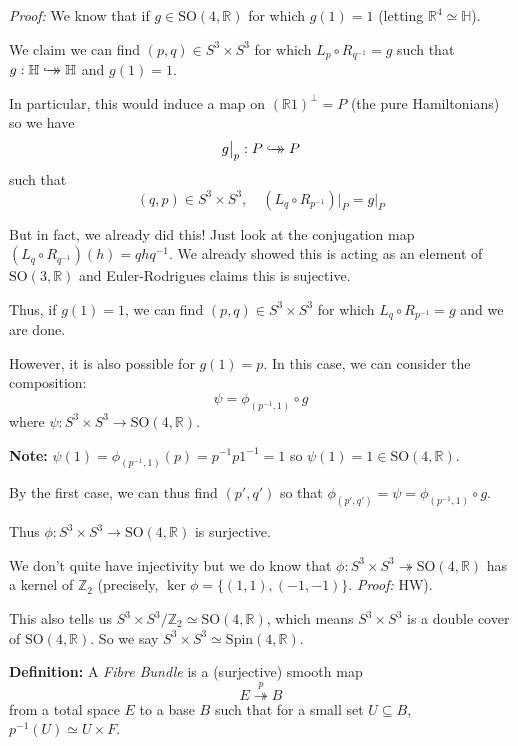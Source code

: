 \documentclass[12pt]{article}
\newcommand{\R}{\mathbb{R}}
\newcommand{\Z}{\mathbb{Z}}
\renewcommand{\H}{\mathbb{H}}
\newcommand{\SO}{\text{SO}}
\newcommand{\biject}{\hookrightarrow \hspace{-8pt} \rightarrow}
\newenvironment*{tbox}[2][gray]{
    \begin{tcolorbox}[
        parbox=false,
        colback=#1!5!white,
        colframe=#1!75!black,
        breakable,
        title={#2}
    ]}
    {\end{tcolorbox}}
\begin{document}
    \begin{tbox}{\textbf{Claim:} This homomorphism is onto $\SO(4, \R)$}
        \emph{Proof:} We know that if $g \in \SO(4, \R)$ for which $g(1) = 1$ (letting $\R^4 \simeq \H$).

        We claim we can find $(p, q) \in S^3 \times S^3$ for which $L_p \circ R_{q^{-1}} = g$ such that $g: \H \biject \H$ and $g(1) = 1$. 

        In particular, this would induce a map on $(\R 1)^{\perp} = P$ (the pure Hamiltonians) so we have 
        \[g\big\vert_p: P \biject P\]
        such that 
        \[(q, p)\in S^3 \times S^3, \quad (L_q \circ R_{p^{-1}})\big\vert_P = g\big\vert_P\]

        But in fact, we already did this! Just look at the conjugation map $(L_q \circ R_{q^{-1}})(h) = qhq^{-1}$. We already showed this is acting as an element of $\SO(3, \R)$ and Euler-Rodrigues claims this is sujective. 

        Thus, if $g(1) = 1$, we can find $(p, q) \in S^3 \times S^3$ for which $L_q \circ R_{p^{-1}} = g$ and we are done. 

        However, it is also possible for $g(1) = p$. In this case, we can consider the composition:
        \[\psi = \phi_{(p^{-1}, 1)} \circ g\]
        where $\psi: S^3 \times S^3 \to \SO(4, \R)$. 

        \textbf{Note:} $\psi(1) = \phi_{(p^{-1}, 1)}(p) = p^{-1}p1^{-1} = 1$ so $\psi(1) = 1 \in \SO(4, \R)$.  
        
        By the first case, we can thus find $(p', q')$ so that $\phi_{(p', q')} = \psi = \phi_{(p^{-1}, 1)} \circ g$. 

        Thus $\phi: S^3 \times S^3 \to \SO(4, \R)$ is surjective. 

        We don't quite have injectivity but we do know that $\phi: S^3 \times S^3 \twoheadrightarrow \SO(4, \R)$ has a kernel of $\Z_2$ (precisely, $\ker \phi = \{(1, 1), (-1, -1)\}$. \emph{Proof:} HW). 

        This also tells us $S^3 \times S^3/\Z_2 \simeq \SO(4, \R)$, which means $S^3 \times S^3$ is a double cover of $\SO(4, \R)$. So we say $S^3 \times S^3 \simeq \text{Spin}(4, \R)$. 
    \end{tbox}

    \textbf{Definition:} A \emph{Fibre Bundle} is a (surjective) smooth map 
    \[E \overset{p}{\twoheadrightarrow} B\]
    from a total space $E$ to a base $B$ such that for a small set $U \subseteq B$, $p^{-1}(U) \simeq U \times F$. 
\end{document}
